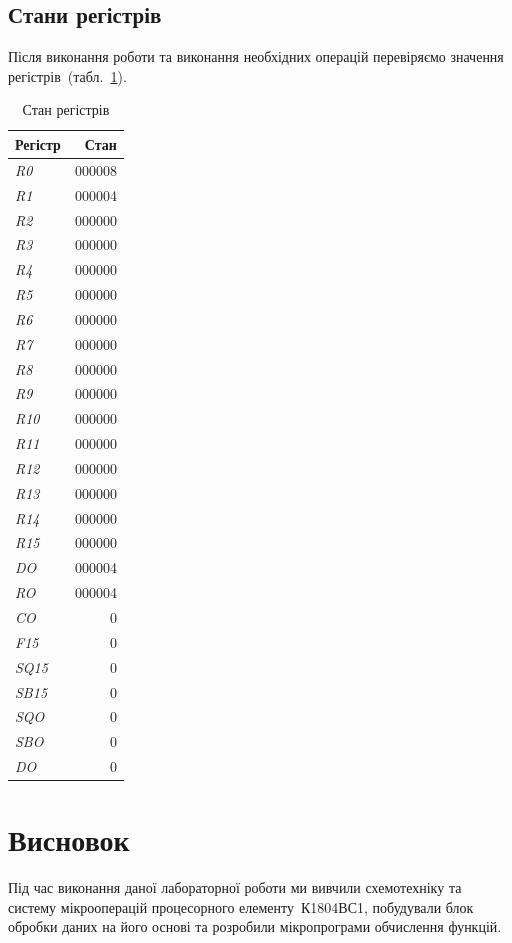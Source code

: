 \documentclass[a4paper,oneside,DIV=12,12pt,headings=normal]{scrartcl}
\newcommand{\schel}[1]{\textit{#1}}
\begin{document}
			\subsection{Стани регістрів}
				Після виконання роботи та виконання необхідних операцій перевіряємо значення регістрів~(табл.~\ref{tab:registers-state}).
				\begin{table}[!htbp]
					\centering
						\begin{tabular}{lr}
							\toprule
								Регістр & Стан \\
							\midrule
								\schel{R0}   & 000008 \\
								\schel{R1}   & 000004 \\
								\schel{R2}   & 000000 \\
								\schel{R3}   & 000000 \\
								\schel{R4}   & 000000 \\
								\schel{R5}   & 000000 \\
								\schel{R6}   & 000000 \\
								\schel{R7}   & 000000 \\
								\schel{R8}   & 000000 \\
								\schel{R9}   & 000000 \\
								\schel{R10}  & 000000 \\
								\schel{R11}  & 000000 \\
								\schel{R12}  & 000000 \\
								\schel{R13}  & 000000 \\
								\schel{R14}  & 000000 \\
								\schel{R15}  & 000000 \\
								\schel{DO}   & 000004 \\
								\schel{RO}   & 000004 \\
								\schel{CO}   & 0 \\
								\schel{F15}  & 0 \\
								\schel{SQ15} & 0 \\
								\schel{SB15} & 0 \\
								\schel{SQO}  & 0 \\
								\schel{SBO}  & 0 \\
								\schel{DO}   & 0 \\
							\bottomrule
						\end{tabular}
					\caption{Стан регістрів}
					\label{tab:registers-state}
				\end{table}

		\section{Висновок}
			Під час виконання даної лабораторної роботи ми вивчили схемотехніку та систему мікрооперацій процесорного елементу~К1804ВС1, побудували блок обробки даних на його основі та розробили мікропрограми обчислення функцій.
\end{document}

